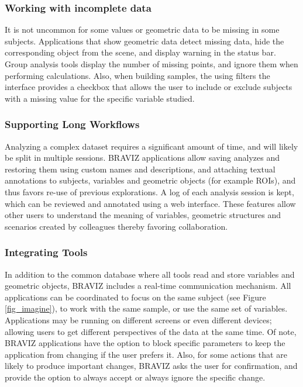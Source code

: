 \documentclass{frontiersHLTH}
\begin{document}
\subsubsection{Working with incomplete data}

It is not uncommon for some values or geometric data to be missing in some subjects. Applications that show geometric data detect missing data, hide the corresponding object from the scene, and display warning in the status bar. Group analysis tools display the number of missing points, and ignore them when performing calculations. Also, when building samples, the using filters the interface provides a checkbox that allows the user to include or exclude subjects with a missing value for the specific variable studied.

\subsubsection{Supporting Long Workflows}

Analyzing a complex dataset requires a significant amount of time, and will likely be split in multiple sessions. BRAVIZ applications allow saving analyzes and restoring them using custom names and descriptions, and attaching textual annotations to subjects, variables and geometric objects (for example ROIs), and thus favors re-use of previous explorations. A log of each analysis session is kept, which can be reviewed and annotated using a web interface. These features allow other users to understand the meaning of variables, geometric structures and scenarios created by colleagues thereby favoring collaboration. 

\subsubsection{Integrating Tools}

In addition to the common database where all tools read and store variables and geometric objects, BRAVIZ includes a real-time communication mechanism. All applications can be coordinated to focus on the same subject (see Figure \ref{fig_imagine}), to work with the same sample, or use the same set of variables. Applications may be running on different screens or even different devices; allowing users to get different perspectives of the data at the same time. Of note, BRAVIZ applications have the option to block specific parameters to keep the application from changing if the user prefers it. Also, for some actions that are likely to produce important changes, BRAVIZ asks the user for confirmation, and provide the option to always accept or always ignore the specific change.
\end{document}
